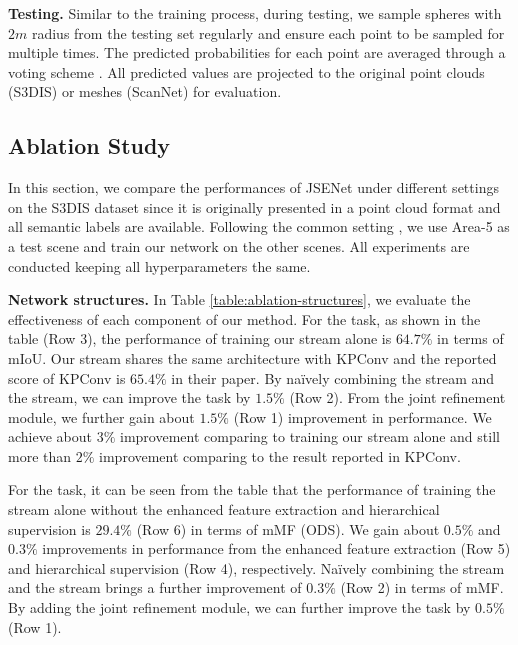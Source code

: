 \documentclass[runningheads]{llncs}
\begin{document}
\smallskip \noindent \textbf{Testing.}
Similar to the training process, during testing, we sample spheres with $2m$ radius from the testing set regularly and ensure each point to be sampled {for} multiple times. The predicted probabilities for each point are averaged through a voting scheme \cite{thomas2019kpconv}.
All predicted values are projected to the original point clouds {(S3DIS)} or meshes {(ScanNet)} for evaluation.


\subsection{Ablation Study} \label{Ablation study}

In this section, we compare the performances of JSENet under different settings on the S3DIS dataset since it is originally presented in a point cloud format and all semantic labels are available. Following the common setting {\cite{qi2017pointnet,tchapmi2017segcloud,thomas2019kpconv,li2018pointcnn,jiang2019hierarchical,tatarchenko2018tangent,Choy_2019}}, we use Area-5 as {a} test scene and train our network on the other scenes. All experiments are conducted keeping all hyperparameters the same. 



\smallskip \noindent \textbf{Network structures.}
In Table \ref{table:ablation-structures}, we evaluate the effectiveness of each component of our method.
For the {\SemSeg} task, as shown in the table (Row 3),
the performance of training our {\SemSeg} stream alone
is $64.7\%$ in terms of mIoU. Our {\SemSeg} stream shares the same architecture {with} KPConv and the reported score of KPConv is $65.4\%$ in their paper. By na\"{i}vely
combining the {\SemSeg} stream and the {\SemEdgeD} stream, we can improve the {\SemSeg} task by $1.5\%$ {(Row 2)}. From the joint refinement module, we further gain about {$1.5\%$} {(Row 1)} improvement in performance. We achieve about $3\%$ improvement comparing to training our {\SemSeg} stream alone and still more than $2\%$ improvement comparing to the result reported in KPConv.  

For the {\SemEdgeD} task, it can be seen from the table that the performance of training the {\SemEdgeD} stream alone without the enhanced feature extraction and hierarchical supervision is $29.4\%$ (Row 6) in terms of mMF (ODS). We gain about {$0.5\%$} and $0.3\%$ improvements in performance from the enhanced feature extraction (Row 5) and hierarchical supervision (Row 4), respectively. 
Na\"{i}vely combining the {\SemSeg} stream and the {\SemEdgeD} stream brings a {further} improvement of $0.3\%$ {(Row 2)} in terms of mMF.
By adding the joint refinement module, we can further improve the {\SemEdgeD} task by $0.5\%$ {(Row 1)}.
\end{document}
